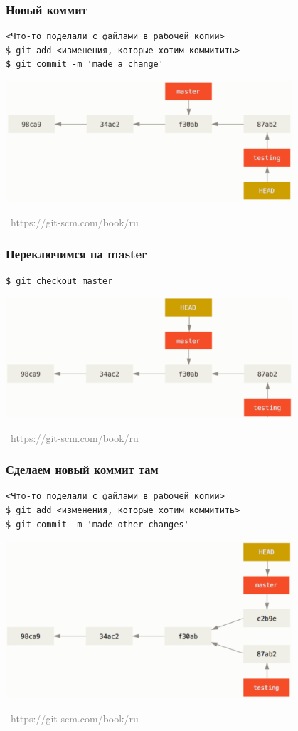 \documentclass[xetex,mathserif,serif]{beamer}
\newcommand{\attribution}[1] {
\vspace{-5mm}\begin{flushright}\begin{scriptsize}\textcolor{gray}{\textcopyright\, #1}\end{scriptsize}\end{flushright}
}
\begin{document}
	\begin{frame}[fragile]
		\frametitle{Новый коммит}
		\begin{verbatim}
<Что-то поделали с файлами в рабочей копии>
$ git add <изменения, которые хотим коммитить>
$ git commit -m 'made a change'
		\end{verbatim}
		\begin{center}
			\includegraphics[width=0.8\textwidth]{newCommit.png}
			\attribution{https://git-scm.com/book/ru}
		\end{center}
	\end{frame}

	\begin{frame}[fragile]
		\frametitle{Переключимся на master}
		\begin{verbatim}
$ git checkout master
		\end{verbatim}
		\begin{center}
			\includegraphics[width=0.8\textwidth]{checkoutToMaster.png}
			\attribution{https://git-scm.com/book/ru}
		\end{center}
	\end{frame}

	\begin{frame}[fragile]
		\frametitle{Сделаем новый коммит там}
		\begin{verbatim}
<Что-то поделали с файлами в рабочей копии>
$ git add <изменения, которые хотим коммитить>
$ git commit -m 'made other changes'
		\end{verbatim}
		\begin{center}
			\includegraphics[width=0.8\textwidth]{newCommitToMaster.png}
			\attribution{https://git-scm.com/book/ru}
		\end{center}
	\end{frame}
\end{document}
